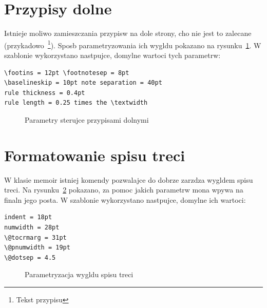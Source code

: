 \section{Przypisy dolne}
Istnieje moliwo zamieszczania przypisw na dole strony, cho nie jest to zalecane (przykadowo~\footnote{Tekst przypisu}). Sposb parametryzowania ich wygldu pokazano na rysunku~\ref{fig:fp}. W szablonie wykorzystano nastpujce, domylne wartoci tych parametrw:
\begin{lstlisting}[basicstyle=\footnotesize\ttfamily]
\footins = 12pt \footnotesep = 8pt
\baselineskip = 10pt note separation = 40pt
rule thickness = 0.4pt
rule length = 0.25 times the \textwidth
\end{lstlisting}
\begin{figure}[htb]
\drawfootnote
\caption{Parametry sterujce przypisami dolnymi} \label{fig:fp}
\end{figure}


\section{Formatowanie spisu treci}
W klasie memoir istniej komendy pozwalajce do dobrze zarzdza wygldem spisu treci. Na rysunku~\ref{fig:ltoc} pokazano, za pomoc jakich parametrw mona wpywa na finaln jego posta. W szablonie wykorzystano nastpujce, domylne ich wartoci:
\begin{lstlisting}[basicstyle=\footnotesize\ttfamily]
indent = 18pt 
numwidth = 28pt
\@tocrmarg = 31pt 
\@pnumwidth = 19pt
\@dotsep = 4.5
\end{lstlisting}

\begin{figure}[b]
\drawtoc
\caption{Parametryzacja wygldu spisu treci} \label{fig:ltoc}
\end{figure}


